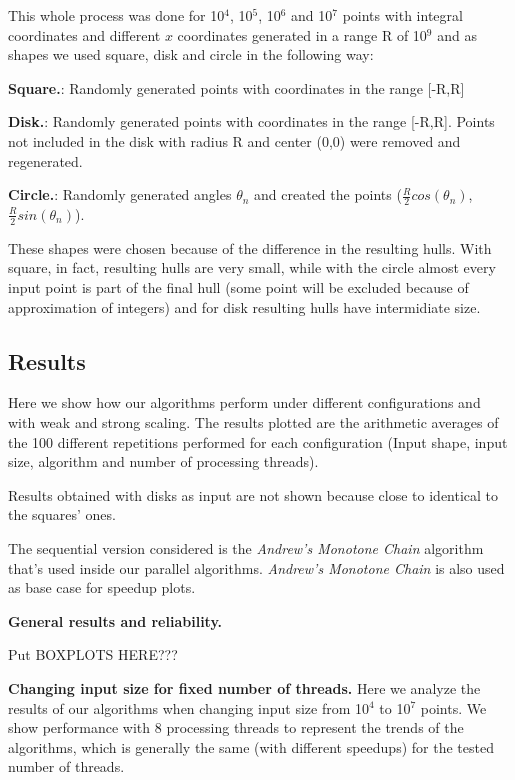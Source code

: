 \documentclass[letterpaper]{article}
\newcommand{\mypar}[1]{{\bf #1.}}
\theoremstyle{definition}
\begin{document}
This whole process was done for 10$^4$, 10$^5$, 10$^6$ and 10$^7$ points with integral coordinates and different $x$ coordinates generated in a range R of 10$^9$ and as shapes we used square, disk and circle in the following way:

\mypar{Square}: Randomly generated points with coordinates in the range [-R,R]

\mypar{Disk}: Randomly generated points with coordinates in the range [-R,R]. Points not included in the disk with radius R and center (0,0) were removed and regenerated.

\mypar{Circle}: Randomly generated angles $\theta_n$ and created the points ($\frac{R}{2}cos(\theta_n)$, $\frac{R}{2}sin(\theta_n)$).

These shapes were chosen because of the difference in the resulting hulls.
With square, in fact, resulting hulls are very small, while with the circle almost every input point is part of the final hull (some point will be excluded because of approximation of integers) and for disk resulting hulls have intermidiate size.

\subsection{Results}

Here we show how our algorithms perform under different configurations and with weak and strong scaling.
The results plotted are the arithmetic averages of the 100 different repetitions performed for each configuration (Input shape, input size, algorithm and number of processing threads).

Results obtained with disks as input are not shown because close to identical to the squares' ones.

The sequential version considered is the \textit{Andrew's Monotone Chain} algorithm that's used inside our parallel algorithms. \textit{Andrew's Monotone Chain} is also used as base case for speedup plots.

\mypar{General results and reliability}

Put BOXPLOTS HERE???

\mypar{Changing input size for fixed number of threads}
Here we analyze the results of our algorithms when changing input size from 10$^4$ to 10$^7$ points. We show performance with 8 processing threads to represent the trends of the algorithms, which is generally the same (with different speedups) for the tested number of threads.
\end{document}
